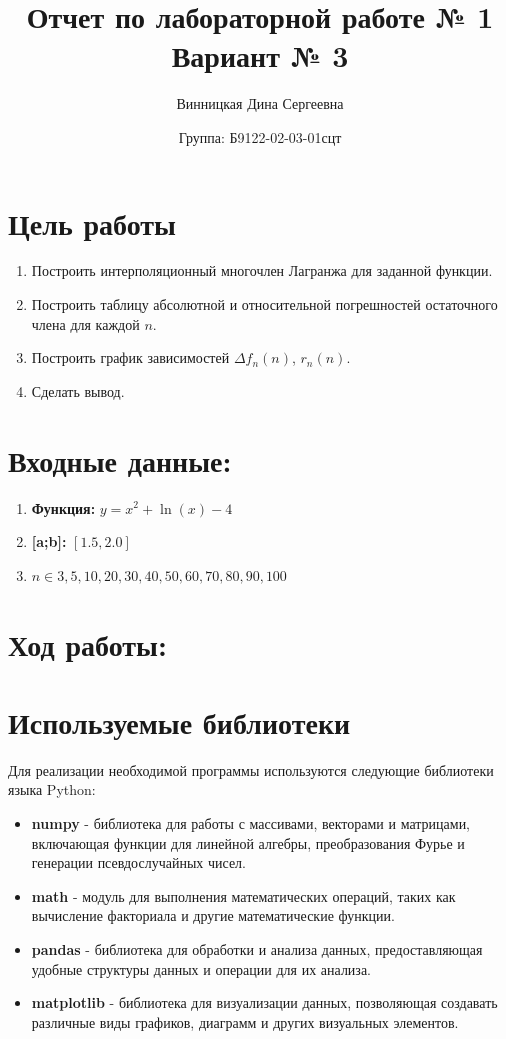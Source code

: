 \documentclass{article}
\title{Отчет по лабораторной работе № 1 \\ Вариант № 3}
\author{Винницкая Дина Сергеевна}
\date{Группа: Б9122-02-03-01сцт}
\begin{document}
\maketitle
\section*{Цель работы}
\begin{enumerate}
    \item Построить интерполяционный многочлен Лагранжа для заданной функции.
    \item Построить таблицу абсолютной и относительной погрешностей остаточного члена для каждой $n$.
    \item Построить график зависимостей $\Delta f_n(n)$, $r_n(n)$.
    \item Сделать вывод.
\end{enumerate}

\section*{Входные данные:}
\begin{enumerate}

    \item \textbf{Функция:} $y=x^2 + \ln(x) - 4$
    \item \textbf{[a;b]:} $[1.5,2.0]$
    \item $n \in {3, 5, 10, 20, 30, 40, 50, 60, 70, 80, 90, 100} $
    
\end{enumerate}

\section*{Ход работы:}

\section{Используемые библиотеки}
Для реализации необходимой программы используются следующие библиотеки языка Python:

\begin{itemize}
    \item \textbf{numpy} - библиотека для работы с массивами, векторами и матрицами, включающая функции для линейной алгебры, преобразования Фурье и генерации псевдослучайных чисел.
    
    \item \textbf{math} - модуль для выполнения математических операций, таких как вычисление факториала и другие математические функции.
    
    \item \textbf{pandas} - библиотека для обработки и анализа данных, предоставляющая удобные структуры данных и операции для их анализа.
    
    \item \textbf{matplotlib} - библиотека для визуализации данных, позволяющая создавать различные виды графиков, диаграмм и других визуальных элементов.
\end{itemize}
\end{document}
